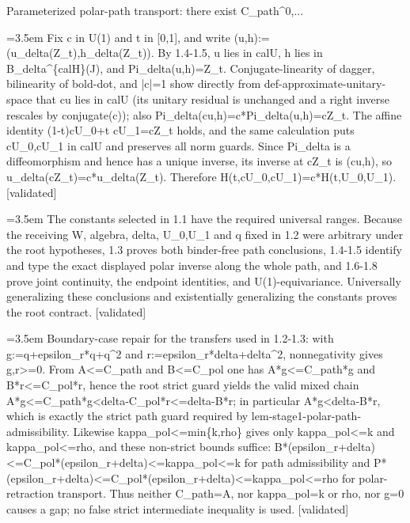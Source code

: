 \documentclass{article}
\newcommand{\step}[1]{\par\noindent\hangindent=3.5em\hangafter=1%
  \makebox[3.5em][l]{\textbf{#1.}}}
\newcommand{\steptag}[1]{\hfill{\small\textsf{[#1]}}}
\begin{document}
\begin{proofbox}{Parameterized polar-path transport: there exist C\_path\textasciicircum{}0,...}
\step{1.8} Fix c in U(1) and t in [0,1], and write (u,h):=(u\_delta(Z\_t),h\_delta(Z\_t)). By 1.4-1.5, u lies in calU, h lies in B\_delta\textasciicircum{}\{calH\}(J), and Pi\_delta(u,h)=Z\_t. Conjugate-linearity of dagger, bilinearity of bold-dot, and |c|=1 show directly from def-approximate-unitary-space that cu lies in calU (its unitary residual is unchanged and a right inverse rescales by conjugate(c)); also Pi\_delta(cu,h)=c*Pi\_delta(u,h)=cZ\_t. The affine identity (1-t)cU\_0+t cU\_1=cZ\_t holds, and the same calculation puts cU\_0,cU\_1 in calU and preserves all norm guards. Since Pi\_delta is a diffeomorphism and hence has a unique inverse, its inverse at cZ\_t is (cu,h), so u\_delta(cZ\_t)=c*u\_delta(Z\_t). Therefore H(t,cU\_0,cU\_1)=c*H(t,U\_0,U\_1). \steptag{validated} \\[4pt]
\step{1.9} The constants selected in 1.1 have the required universal ranges. Because the receiving W, algebra, delta, U\_0,U\_1 and q fixed in 1.2 were arbitrary under the root hypotheses, 1.3 proves both binder-free path conclusions, 1.4-1.5 identify and type the exact displayed polar inverse along the whole path, and 1.6-1.8 prove joint continuity, the endpoint identities, and U(1)-equivariance. Universally generalizing these conclusions and existentially generalizing the constants proves the root contract. \steptag{validated} \\[4pt]
\step{1.10} Boundary-case repair for the transfers used in 1.2-1.3: with g:=q+epsilon\_r*q+q\textasciicircum{}2 and r:=epsilon\_r*delta+delta\textasciicircum{}2, nonnegativity gives g,r>=0. From A<=C\_path and B<=C\_pol one has A*g<=C\_path*g and B*r<=C\_pol*r, hence the root strict guard yields the valid mixed chain A*g<=C\_path*g<delta-C\_pol*r<=delta-B*r; in particular A*g<delta-B*r, which is exactly the strict path guard required by lem-stage1-polar-path-admissibility. Likewise kappa\_pol<=min\{k,rho\} gives only kappa\_pol<=k and kappa\_pol<=rho, and these non-strict bounds suffice: B*(epsilon\_r+delta)<=C\_pol*(epsilon\_r+delta)<=kappa\_pol<=k for path admissibility and P*(epsilon\_r+delta)<=C\_pol*(epsilon\_r+delta)<=kappa\_pol<=rho for polar-retraction transport. Thus neither C\_path=A, nor kappa\_pol=k or rho, nor g=0 causes a gap; no false strict intermediate inequality is used. \steptag{validated} \\[4pt]
\end{proofbox}
\end{document}
